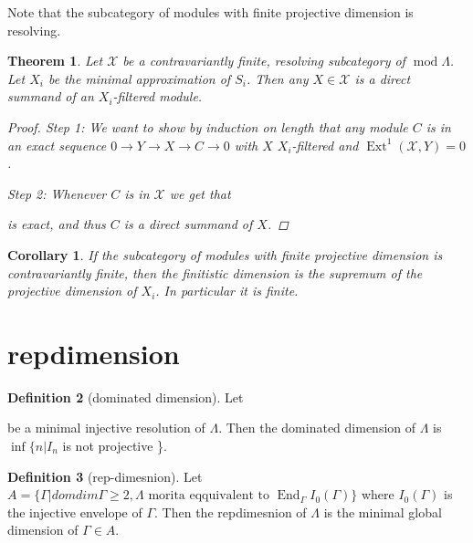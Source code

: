 \documentclass[11pt, a4paper, english]{article}
\newtheorem{theorem}{Theorem}[section]
\newtheorem{cor}{Corollary}[theorem]
\theoremstyle{definition}
\newtheorem{defn}[theorem]{Definition}
\DeclareMathOperator{\Hom}{Hom}
\DeclareMathOperator{\Ext}{Ext}
\DeclareMathOperator{\End}{End}
\def\mod{\operatorname{mod}}
\begin{document}
Note that the subcategory of modules with finite projective dimension is resolving.

\begin{theorem} \cite[3.8]{AR91}
	Let $\mathcal X$ be a contravariantly finite, resolving subcategory of $\mod \Lambda$. Let $X_i$ be the minimal approximation of $S_i$. Then any $X \in \mathcal X$ is a direct summand of an $X_i$-filtered module.
	\begin{proof}
		Step 1: We want to show by induction on length that any module $C$ is in an exact sequence $0 \to Y \to X \to C \to 0$ with $X$ $X_i$-filtered and $\Ext^1(\mathcal X, Y)=0$.
		
		Step 2: Whenever $C$ is in $\mathcal X$ we get that
		
		is exact, and thus $C$ is a direct summand of $X$.
	\end{proof}
\end{theorem}

\begin{cor}
	If the subcategory of modules with finite projective dimension is contravariantly finite, then the finitistic dimension is the supremum of the projective dimension of $X_i$. In particular it is finite.
\end{cor}

\section{repdimension}
\begin{defn}[dominated dimension]
	Let 
	be a minimal injective resolution of $\Lambda$. Then the dominated dimension of $\Lambda$ is $\inf\{n | I_n$ is not projective \}.
\end{defn}

\begin{defn}[rep-dimesnion]
	Let $A = \{\Gamma | domdim\Gamma \geq 2, \Lambda \text{ morita eqquivalent to } \End_\Gamma{I_0(\Gamma)}\}$ where $I_0(\Gamma)$ is the injective envelope of $\Gamma$. Then the repdimesnion of $\Lambda$ is the minimal global dimension of $\Gamma \in A$.
\end{defn}
\end{document}

